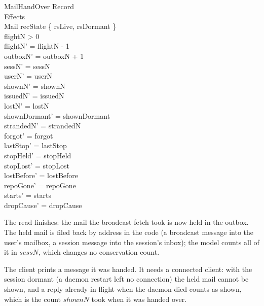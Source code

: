 \documentclass[a4paper,10pt,fleqn]{article}
\begin{document}
\begin{schema}{MailHandOver}
  \Xi Record \\
  \Xi Effects \\
  \Delta Mail
  \where
  recState \in \{ rsLive, rsDormant \} \\
  flightN > 0 \\
  flightN' = flightN - 1 \\
  outboxN' = outboxN + 1 \\
  sessN' = sessN \\
  userN' = userN \\
  shownN' = shownN \\
  issuedN' = issuedN \\
  lostN' = lostN \\
  shownDormant' = shownDormant \\
  strandedN' = strandedN \\
  forgot' = forgot \\
  lastStop' = lastStop \\
  stopHeld' = stopHeld \\
  stopLost' = stopLost \\
  lostBefore' = lostBefore \\
  repoGone' = repoGone \\
  starts' = starts \\
  dropCause' = dropCause
\end{schema}

The read finishes: the mail the broadcast fetch took is now held in the outbox.  The held mail is
filed back by address in the code (a broadcast message into the user's mailbox, a session
message into the session's inbox); the model counts all of it in $sessN$, which changes no
conservation count.


The client prints a message it was handed.  It needs a connected client: with the
session dormant (a daemon restart left no connection) the held mail cannot be
shown, and a reply already in flight when the daemon died counts as shown, which
is the count $shownN$ took when it was handed over.
\end{document}
